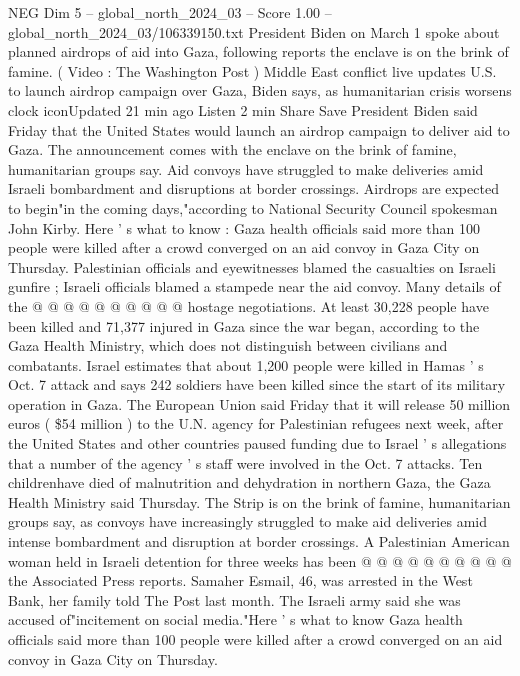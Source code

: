 \begin{textsample}{NEG Dim 5 – global\_north\_2024\_03 – Score 1.00 – global\_north\_2024\_03/106339150.txt}  \label{ex:f5_neg_088}
President Biden on March 1 spoke about planned airdrops of aid into Gaza, following reports the enclave is on the brink of famine. ( Video : The Washington Post ) Middle East conflict live updates U.S. to launch airdrop campaign over Gaza, Biden says, as humanitarian crisis worsens clock iconUpdated 21 min ago Listen 2 min Share Save President Biden said Friday that the United States would launch an airdrop campaign to deliver aid to Gaza.
The announcement comes with the enclave on the brink of famine, humanitarian groups say.
Aid convoys have struggled to make deliveries amid Israeli bombardment and disruptions at border crossings.
Airdrops are expected to begin"in the coming days,"according to National Security Council spokesman John Kirby.
Here ' s what to know : Gaza health officials said more than 100 people were killed after a crowd converged on an aid convoy in Gaza City on Thursday.
Palestinian officials and eyewitnesses blamed the casualties on Israeli gunfire ; Israeli officials blamed a stampede near the aid convoy.
Many details of the @ @ @ @ @ @ @ @ @ @ hostage negotiations.
At least 30,228 people have been killed and 71,377 injured in Gaza since the war began, according to the Gaza Health Ministry, which does not distinguish between civilians and combatants.
Israel estimates that about 1,200 people were killed in Hamas ' s Oct. 7 attack and says 242 soldiers have been killed since the start of its military operation in Gaza.
The European Union said Friday that it will release 50 million euros ( \$54 million ) to the U.N. agency for Palestinian refugees next week, after the United States and other countries paused funding due to Israel ' s allegations that a number of the agency ' s staff were involved in the Oct. 7 attacks.
Ten childrenhave died of malnutrition and dehydration in northern Gaza, the Gaza Health Ministry said Thursday.
The Strip is on the brink of famine, humanitarian groups say, as convoys have increasingly struggled to make aid deliveries amid intense bombardment and disruption at border crossings.
A Palestinian American woman held in Israeli detention for three weeks has been @ @ @ @ @ @ @ @ @ @ the Associated Press reports.
Samaher Esmail, 46, was arrested in the West Bank, her family told The Post last month.
The Israeli army said she was accused of"incitement on social media."Here ' s what to know Gaza health officials said more than 100 people were killed after a crowd converged on an aid convoy in Gaza City on Thursday.

\end{textsample}
